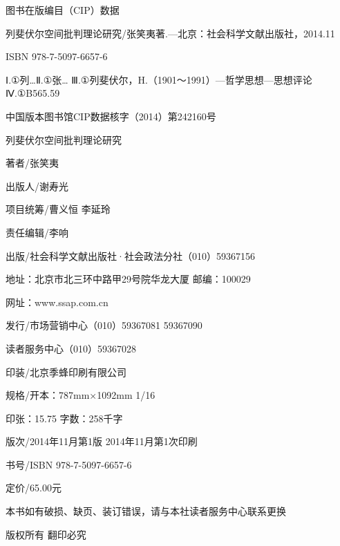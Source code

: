 \documentclass[UTF8, fontset = sourcesans, a4paper, oneside, zihao =
-4, scheme=chinese, no-math, space=true]{ctexbook}
\begin{document}
图书在版编目（CIP）数据

列斐伏尔空间批判理论研究/张笑夷著.---北京：社会科学文献出版社，2014.11

ISBN 978-7-5097-6657-6

Ⅰ.①列\ldots Ⅱ.①张\ldots
Ⅲ.①列斐伏尔，H.（1901～1991）---哲学思想---思想评论 Ⅳ.①B565.59

中国版本图书馆CIP数据核字（2014）第242160号

列斐伏尔空间批判理论研究

著者/张笑夷

出版人/谢寿光

项目统筹/曹义恒 李延玲

责任编辑/李响

出版/社会科学文献出版社·社会政法分社（010）59367156

地址：北京市北三环中路甲29号院华龙大厦 邮编：100029

网址：www.ssap.com.cn

发行/市场营销中心（010）59367081 59367090

读者服务中心（010）59367028

印装/北京季蜂印刷有限公司

规格/开本：787mm×1092mm 1/16

印张：15.75 字数：258千字

版次/2014年11月第1版 2014年11月第1次印刷

书号/ISBN 978-7-5097-6657-6

定价/65.00元

本书如有破损、缺页、装订错误，请与本社读者服务中心联系更换

版权所有 翻印必究

\protect\hypertarget{part0015.html}{}{}
\end{document}
